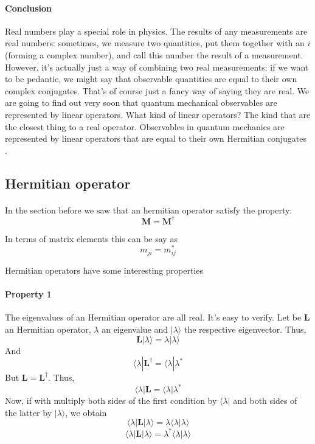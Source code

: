 \documentclass[a4paper,10pt]{article}
\begin{document}
\paragraph{Conclusion} Real numbers play a special role in physics. The results of any measurements are real numbers: sometimes, we measure two quantities, put them together with an $i$ (forming a complex number), and call this number the result of a measurement. However, it’s actually just a way of combining two real measurements: if we want to be pedantic, we might say that observable quantities are equal to their own complex conjugates. That’s of course just a fancy way of saying they are real. We are going to find out very soon that quantum mechanical observables are represented by linear operators. What kind of linear operators? The kind that are the closest thing to a real operator. Observables in quantum mechanics are represented by linear operators that are equal to their own Hermitian conjugates \cite{susskind2014quantum}.

\subsection{Hermitian operator}

\paragraph{} In the section before we saw that an hermitian operator satisfy the property:
\begin{equation}
\mathbf{M} = \mathbf{M}^\dagger
\label{eq:hermitianOperator}
\end{equation}

In terms of matrix elements this can be say as
\begin{equation*}
m_{ji} = m_{ij}^*
\label{eq:hermitianOperatorMatrixElement}
\end{equation*}

Hermitian operators have some interesting properties

\paragraph{Property 1} The eigenvalues of an Hermitian operator are all real. It's easy to verify. Let be $\mathbf{L}$ an Hermitian operator, $\lambda$ an eigenvalue and $|\lambda\rangle$ the respective eigenvector. Thus,
$$\mathbf{L}|\lambda\rangle = \lambda|\lambda\rangle$$
And
$$\langle\lambda|\mathbf{L}^\dagger = \langle\lambda|\lambda^*$$
But $\mathbf{L} = \mathbf{L}^\dagger$. Thus,
$$\langle\lambda|\mathbf{L} = \langle\lambda|\lambda^*$$
Now, if with multiply both sides of the first condition by $\langle\lambda|$ and both sides of the latter by $|\lambda\rangle$, we obtain
$$\langle\lambda|\mathbf{L}|\lambda\rangle = \lambda\langle\lambda|\lambda\rangle$$
$$\langle\lambda|\mathbf{L}|\lambda\rangle = \lambda^*\langle\lambda|\lambda\rangle$$
\end{document}
